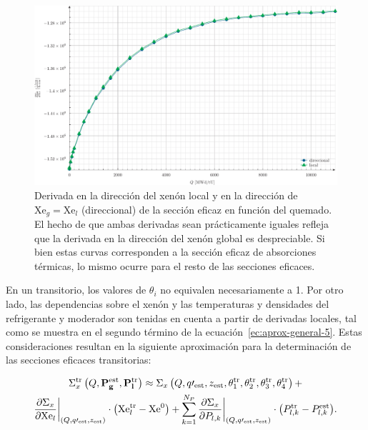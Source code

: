 \documentclass[11pt]{article}
\renewcommand{\vec}[1]{\ensuremath\mathbf{#1}}
\begin{document}
\begin{figure}[!h]
 \begin{center}
  \includegraphics[width=0.75\linewidth]{graficos/dependencia-dxs-xenon/dxs.pdf}
 \end{center}
\caption{\label{fig:dependencias-xenon} Derivada en la dirección del xenón local y en la dirección de $\text{Xe}_g = \text{Xe}_l$ (direccional) de la sección eficaz en función del quemado. El hecho de que ambas derivadas sean prácticamente iguales refleja que la derivada en la dirección del xenón global es despreciable. Si bien estas curvas corresponden a la sección eficaz de absorciones térmicas, lo mismo ocurre para el resto de las secciones eficaces.}
\end{figure}

En un transitorio, los valores de $\theta_i$ no equivalen necesariamente a \num{1}. Por otro lado, las dependencias sobre el xenón y las temperaturas y densidades del refrigerante y moderador son tenidas en cuenta a partir de derivadas locales, tal como se muestra en el segundo término de la ecuación~\ref{ec:aprox-general-5}. Estas consideraciones resultan en la siguiente aproximación para la determinación de las secciones eficaces transitorias:

\begin{multline} \label{ec:aprox-general-8}
 \Sigma^{\text{tr}}_x \left( Q, \vec{P^{\text{est}}_g}, \vec{P^{\text{tr}}_l} \right) \approx
 \Sigma_x \left( Q, q\prime_{\text{est}}, z_{\text{est}}, \theta^{\text{tr}}_1, \theta^{\text{tr}}_2, \theta^{\text{tr}}_3, \theta^{\text{tr}}_4 \right) + \\
 \frac{\partial\Sigma_x}{\partial \text{Xe}_l}\bigg|_{\left( Q, q\prime_{\text{est}}, z_{\text{est}} \right)} \cdot \left( \text{Xe}^{\text{tr}}_l - \text{Xe}^0 \right) +
 \sum_{k = 1}^{N_{P}}{\frac{\partial\Sigma_x}{\partial P_{l,k}}\bigg|_{\left( Q, q\prime_{\text{est}}, z_{\text{est}} \right)} \cdot \left(P^{\text{tr}}_{l,k} - P^{\text{est}}_{l,k} \right)}.
\end{multline}
\end{document}
